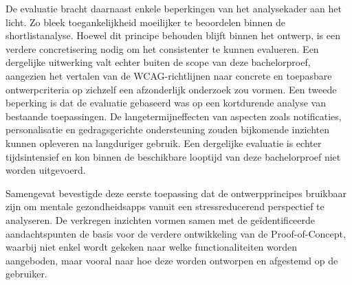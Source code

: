 \vspace{1em}

De evaluatie bracht daarnaast enkele beperkingen van het analysekader aan het licht. Zo bleek toegankelijkheid moeilijker te beoordelen binnen de shortlistanalyse. Hoewel dit principe behouden blijft binnen het ontwerp, is een verdere concretisering nodig om het consistenter te kunnen evalueren. Een dergelijke uitwerking valt echter buiten de scope van deze bachelorproef, aangezien het vertalen van de WCAG-richtlijnen naar concrete en toepasbare ontwerpcriteria op zichzelf een afzonderlijk onderzoek zou vormen. Een tweede beperking is dat de evaluatie gebaseerd was op een kortdurende analyse van bestaande toepassingen. De langetermijneffecten van aspecten zoals notificaties, personalisatie en gedragsgerichte ondersteuning zouden bijkomende inzichten kunnen opleveren na langduriger gebruik. Een dergelijke evaluatie is echter tijdsintensief en kon binnen de beschikbare looptijd van deze bachelorproef niet worden uitgevoerd.

\vspace{1em}

Samengevat bevestigde deze eerste toepassing dat de ontwerpprincipes bruikbaar zijn om mentale gezondheidsapps vanuit een stressreducerend perspectief te analyseren. De verkregen inzichten vormen samen met de geïdentificeerde aandachtspunten de basis voor de verdere ontwikkeling van de Proof-of-Concept, waarbij niet enkel wordt gekeken naar welke functionaliteiten worden aangeboden, maar vooral naar hoe deze worden ontworpen en afgestemd op de gebruiker.